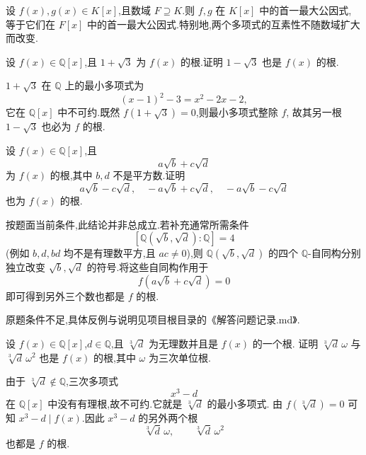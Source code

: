 \begin{theorem}[\markstar]
设 $f(x),g(x)\in K[x]$,且数域 $F\supseteq K$.则 $f,g$ 在 $K[x]$ 中的首一最大公因式,
等于它们在 $F[x]$ 中的首一最大公因式.特别地,两个多项式的互素性不随数域扩大而改变.
\end{theorem}

\begin{example}
设 $f(x)\in\mathbb{Q}[x]$,且 $1+\sqrt3$ 为 $f(x)$ 的根.证明 $1-\sqrt3$ 也是 $f(x)$ 的根.
\end{example}
\exampleblank

\begin{solution}
$1+\sqrt3$ 在 $\mathbb{Q}$ 上的最小多项式为
\[
  (x-1)^2-3=x^2-2x-2,
\]
它在 $\mathbb{Q}[x]$ 中不可约.既然 $f(1+\sqrt3)=0$,则最小多项式整除 $f$,
故其另一根 $1-\sqrt3$ 也必为 $f$ 的根.
\end{solution}

\begin{example}
设 $f(x)\in\mathbb{Q}[x]$,且
\[
  a\sqrt b+c\sqrt d
\]
为 $f(x)$ 的根,其中 $b,d$ 不是平方数.证明
\[
  a\sqrt b-c\sqrt d,
  \quad
  -a\sqrt b+c\sqrt d,
  \quad
  -a\sqrt b-c\sqrt d
\]
也为 $f(x)$ 的根.
\end{example}
\exampleblank

\begin{solution}
按题面当前条件,此结论并非总成立.若补充通常所需条件
\[
  [\mathbb{Q}(\sqrt b,\sqrt d):\mathbb{Q}]=4
\]
(例如 $b,d,bd$ 均不是有理数平方,且 $ac\ne0$),则
$\mathbb{Q}(\sqrt b,\sqrt d)$ 的四个 $\mathbb{Q}$-自同构分别独立改变
$\sqrt b,\sqrt d$ 的符号.将这些自同构作用于
\[
  f(a\sqrt b+c\sqrt d)=0
\]
即可得到另外三个数也都是 $f$ 的根.

原题条件不足,具体反例与说明见项目根目录的《解答问题记录.md》.
\end{solution}

\begin{example}
设 $f(x)\in\mathbb{Q}[x]$,$d\in\mathbb{Q}$,且 $\sqrt[3]{d}$ 为无理数并且是 $f(x)$ 的一个根.
证明 $\sqrt[3]{d}\,\omega$ 与 $\sqrt[3]{d}\,\omega^2$ 也是 $f(x)$ 的根,其中 $\omega$ 为三次单位根.
\end{example}
\exampleblank

\begin{solution}
由于 $\sqrt[3]{d}\notin\mathbb{Q}$,三次多项式
\[
  x^3-d
\]
在 $\mathbb{Q}[x]$ 中没有有理根,故不可约.它就是 $\sqrt[3]{d}$ 的最小多项式.
由 $f(\sqrt[3]{d})=0$ 可知 $x^3-d\mid f(x)$.因此 $x^3-d$ 的另外两个根
\[
  \sqrt[3]{d}\,\omega,
  \qquad
  \sqrt[3]{d}\,\omega^2
\]
也都是 $f$ 的根.
\end{solution}

